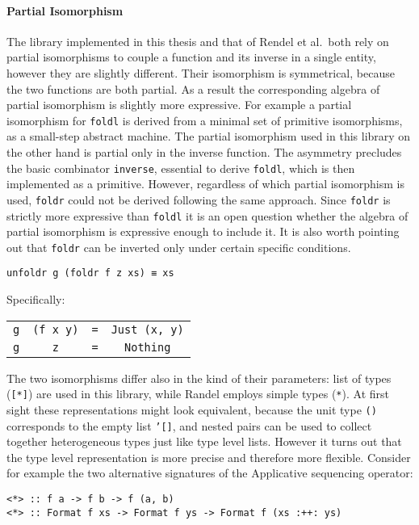 \documentclass[../Thesis.tex]{subfiles}
\begin{document}
\paragraph{Partial Isomorphism}
The library implemented in this thesis and that of Rendel et al.\ 
both rely on partial isomorphisms to couple a function and its inverse in a single entity, however they are slightly different.
Their isomorphism is symmetrical, because the two functions are both
partial. As a result the corresponding algebra of partial isomorphism 
is slightly more expressive. For example a partial isomorphism
for \texttt{foldl} is derived from a minimal set of primitive
isomorphisms, as a small-step abstract machine.
The partial isomorphism used in this library on the other hand
is partial only in the inverse function.
The asymmetry precludes the basic combinator \texttt{inverse},
essential to derive \texttt{foldl}, which is then implemented as a primitive. However, regardless of which partial isomorphism is used, 
\texttt{foldr} could not be derived following the same approach.
Since \texttt{foldr} is strictly more expressive than \texttt{foldl} it is an
open question whether the algebra of partial isomorphism is expressive
enough to include it.
It is also worth pointing out that \texttt{foldr} can be inverted only under certain specific conditions.
\begin{center}
\texttt{unfoldr g (foldr f z xs) ≡ xs}
\end{center}
Specifically:
\begin{center}
\begin{tabular}{cccc}
\texttt{g}  &\texttt{(f x y)} &\texttt{=} &\texttt{Just (x, y)} \\
\texttt{g}  &\texttt{z}        &\texttt{=} &\texttt{Nothing}
\end{tabular}
\end{center}

The two isomorphisms differ also in the kind of their parameters:
list of types (\texttt{[*]}) are used in this library, while
Randel employs simple types (\texttt{*}).
At first sight these representations might look equivalent, because
the unit type \texttt{()} corresponds to the empty list \texttt{'[]},
and nested pairs can be used to collect together heterogeneous types
just like type level lists.
However it turns out that the type level representation is more precise
and therefore more flexible.
Consider for example the two alternative signatures of the Applicative sequencing operator:

\begin{verbatim}
<*> :: f a -> f b -> f (a, b)
<*> :: Format f xs -> Format f ys -> Format f (xs :++: ys)
\end{verbatim}
\end{document}
